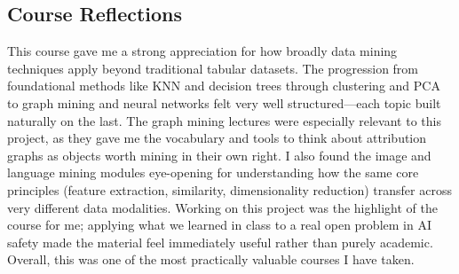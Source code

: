 \documentclass[10pt,twocolumn]{article}
\begin{document}
\subsection{Course Reflections}

This course gave me a strong appreciation for how broadly data mining techniques apply beyond traditional tabular datasets. The progression from foundational methods like KNN and decision trees through clustering and PCA to graph mining and neural networks felt very well structured---each topic built naturally on the last. The graph mining lectures were especially relevant to this project, as they gave me the vocabulary and tools to think about attribution graphs as objects worth mining in their own right. I also found the image and language mining modules eye-opening for understanding how the same core principles (feature extraction, similarity, dimensionality reduction) transfer across very different data modalities. Working on this project was the highlight of the course for me; applying what we learned in class to a real open problem in AI safety made the material feel immediately useful rather than purely academic. Overall, this was one of the most practically valuable courses I have taken.
\end{document}
